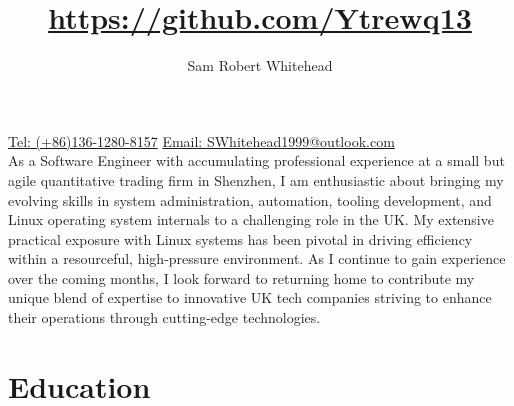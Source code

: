 



\title{\url{https://github.com/Ytrewq13}}
\author{Sam Robert Whitehead}

\maketitle

\pagestyle{empty}
\thispagestyle{empty}

\href{tel:(+86)13612808157}{Tel: (+86)136-1280-8157} \hfill
\href{mailto:SWhitehead1999@outlook.com}{Email: SWhitehead1999@outlook.com}
\\
As a Software Engineer with accumulating professional experience
at a small but agile quantitative trading firm in Shenzhen, I am enthusiastic
about bringing my evolving skills in system administration, automation, tooling
development, and Linux operating system internals to a challenging role in the
UK. My extensive practical exposure with Linux systems has been pivotal in
driving efficiency within a resourceful, high-pressure environment. As I
continue to gain experience over the coming months, I look forward to returning
home to contribute my unique blend of expertise to innovative UK tech companies
striving to enhance their operations through cutting-edge technologies.

\section{Education}
